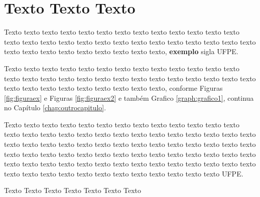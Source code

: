 \section{Texto Texto Texto}
\label{motivacao}

Texto texto texto texto texto texto texto texto texto texto texto texto texto texto texto texto texto texto texto texto texto texto texto texto texto texto texto texto texto texto texto texto texto texto texto texto, \textbf{exemplo} sigla \gls{UFPE}.



Texto texto texto texto texto texto texto texto texto texto texto texto texto texto texto texto texto texto texto texto texto texto texto texto texto texto texto texto texto texto texto texto texto texto texto texto, conforme Figuras \ref{fig:figuraex} e Figuras \ref{fig:figuraex2} e também Grafico \ref{graph:grafico1}, continua no Capítulo \ref{chap:outrocapitulo}.




Texto texto texto texto texto texto texto texto texto texto texto texto texto texto texto texto texto texto texto texto texto texto texto texto texto texto texto texto texto texto texto texto texto texto texto texto texto texto texto texto texto texto texto texto texto texto texto texto texto texto texto texto texto texto texto texto texto texto texto texto texto texto texto texto texto texto texto texto texto texto texto texto texto texto texto texto texto texto texto texto texto \gls{UFPE}.

\begin{grafico}[ht!]
\centering

\caption{\textmd{Texto Texto Texto Texto Texto Texto Texto}}
\label{graph:grafico1}

\end{grafico}


